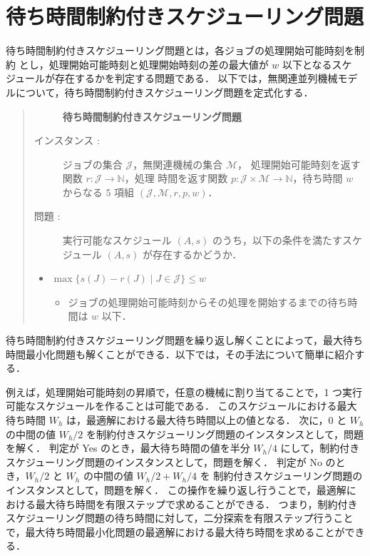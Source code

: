 \documentclass[12pt]{optlab-bachelor}
\begin{document}
\section{待ち時間制約付きスケジューリング問題}
待ち時間制約付きスケジューリング問題とは，各ジョブの処理開始可能時刻を制約
とし，処理開始可能時刻と処理開始時刻の差の最大値が $w$ 以下となるスケ
ジュールが存在するかを判定する問題である．
以下では，無関連並列機械モデルについて，待ち時間制約付きスケジューリング問題を定式化する．

\begin{quote}
  \begin{description}
    \item[] {\bf 待ち時間制約付きスケジューリング問題}
    \item[インスタンス : ]
    ジョブの集合 $\mathcal{J}$，無関連機械の集合 $\mathcal{M}$，
    処理開始可能時刻を返す関数 $r : \mathcal{J} \to \mathbb{N}$，処理
    時間を返す関数 $p : \mathcal{J} \times \mathcal{M} \to \mathbb{N}$，待ち時間 $w$ からなる 5 項組 $(\mathcal{J}, \mathcal{M}, r, p, w)$．

    \item[問題 : ] 実行可能なスケジュール $(A,s)$ のうち，以下の条件を満たすスケジュール $(A,s)$ が存在するかどうか．
  \end{description}

  \begin{itemize}
    \item $\max\big\{s(J) - r(J) \mid J \in \mathcal{J}\big\} \le w$
    \begin{itemize}
      \item ジョブの処理開始可能時刻からその処理を開始するまでの待ち時間は $w$ 以下．
    \end{itemize}
  \end{itemize}
\end{quote}

待ち時間制約付きスケジューリング問題を繰り返し解くことによって，最大待ち時間最小化問題も解くことができる．以下では，その手法について簡単に紹介する．

例えば，処理開始可能時刻の昇順で，任意の機械に割り当てることで，1 つ実行可能なスケジュールを作ることは可能である．
このスケジュールにおける最大待ち時間 $W_h$ は，最適解における最大待ち時間以上の値となる．
次に，$0$ と $W_h$ の中間の値 $W_h/2$ を制約付きスケジューリング問題のインスタンスとして，問題を解く．
判定が Yes のとき，最大待ち時間の値を半分 $W_h/4$ にして，制約付きスケジューリング問題のインスタンスとして，問題を解く．
判定が No のとき，$W_h/2$ と $W_h$ の中間の値 $W_h/2 + W_h/4$ を 制約付きスケジューリング問題のインスタンスとして，問題を解く．
この操作を繰り返し行うことで，最適解における最大待ち時間を有限ステップで求めることができる．
つまり，制約付きスケジューリング問題の待ち時間に対して，二分探索を有限ステップ行うことで，最大待ち時間最小化問題の最適解における最大待ち時間を求めることができる．
\end{document}
